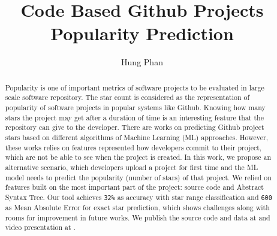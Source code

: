 \documentclass[sigconf]{acmart}
\title[CodeBasedStarPrediction]{Code Based Github Projects Popularity Prediction}
\author[1]{Hung Phan}
\affil[1]{Computer Science Department, Iowa State University}
\begin{document}
\begin{abstract}
Popularity is one of important metrics of software projects to be evaluated in large scale software repository. The star count is considered as the representation of popularity of software projects in popular systems like Github. Knowing how many stars the project may get after a duration of time is an interesting feature that the repository can give to the developer. There are works on predicting Github project stars based on different algorithms of Machine Learning (ML) approaches. However, these works relies on features represented how developers commit to their project, which are not be able to see when the project is created. In this work, we propose an alternative scenario, which developers upload a project for first time and the ML model needs to predict the popularity (number of stars) of that project. We relied on features built on the most important part of the project: source code and Abstract Syntax Tree. Our tool achieves \texttt{32\%} as accuracy with star range classification and \texttt{600} as Mean Absolute Error for exact star prediction, which shows challenges along with rooms for improvement in future works. We publish the source code and data at \cite{001} and video presentation at \cite{014}.
\end{abstract}





\maketitle











\end{document}
